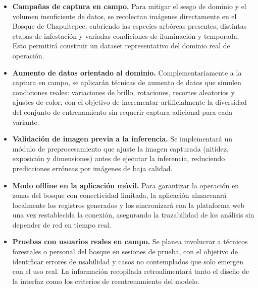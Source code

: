 \begin{itemize}
    \item \textbf{Campañas de captura en campo.} Para mitigar el sesgo de dominio y el volumen insuficiente de datos, se recolectan imágenes directamente en el Bosque de Chapultepec, cubriendo las especies arbóreas presentes, distintas etapas de infestación y variadas condiciones de iluminación y temporada. Esto permitirá construir un dataset representativo del dominio real de operación.

    \item \textbf{Aumento de datos orientado al dominio.} Complementariamente a la captura en campo, se aplicarán técnicas de aumento de datos que simulen condiciones reales: variaciones de brillo, rotaciones, recortes aleatorios y ajustes de color, con el objetivo de incrementar artificialmente la diversidad del conjunto de entrenamiento sin requerir captura adicional para cada variante.

    \item \textbf{Validación de imagen previa a la inferencia.} Se implementará un módulo de preprocesamiento que ajuste la imagen capturada (nitidez, exposición y dimensiones) antes de ejecutar la inferencia, reduciendo predicciones erróneas por imágenes de baja calidad.

    \item \textbf{Modo offline en la aplicación móvil.} Para garantizar la operación en zonas del bosque con conectividad limitada, la aplicación almacenará localmente los registros generados y los sincronizará con la plataforma web una vez restablecida la conexión, asegurando la trazabilidad de los análisis sin depender de red en tiempo real.

    \item \textbf{Pruebas con usuarios reales en campo.} Se planea involucrar a técnicos forestales o personal del bosque en sesiones de prueba, con el objetivo de identificar errores de usabilidad y casos no contemplados que solo emergen con el uso real. La información recopilada retroalimentará tanto el diseño de la interfaz como los criterios de reentrenamiento del modelo.

\end{itemize}